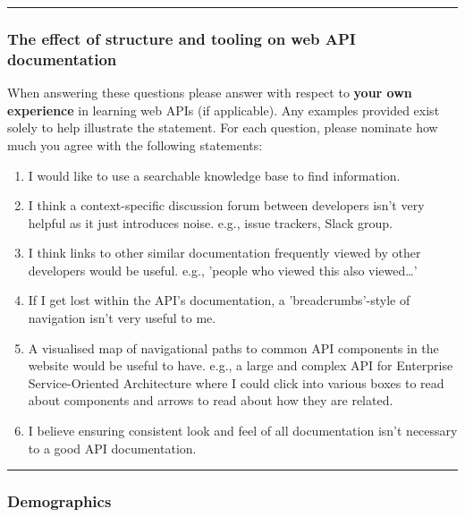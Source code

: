 \bigskip\hrule
\subsubsection*{The effect of structure and tooling on web API documentation}\noindent
When answering these questions please answer with respect to \textbf{your own experience} in learning web APIs (if applicable). Any examples provided exist solely to help illustrate the statement. For each question, please nominate how much you agree with the following statements: \AgreementScale

\begin{enumerate}[label=Q7\alph*.,leftmargin=2\parindent]
\item I would like to use a searchable knowledge base to find information.
\item I think a context-specific discussion forum between developers isn't very helpful as it just introduces noise.  
  e.g., issue trackers, Slack group. 
\item I think links to other similar documentation frequently viewed by other developers would be useful. 
   e.g., 'people who viewed this also viewed…' 
\item If I get lost within the API's documentation, a 'breadcrumbs'-style of navigation isn't very useful to me. 
\item A visualised map of navigational paths to common API components in the website would be useful to have. 
   e.g., a large and complex API for Enterprise Service-Oriented Architecture where I could click into various boxes to read about components and arrows to read about how they are related.   
\item I believe ensuring consistent look and feel of all documentation isn't necessary to a good API documentation. 
\end{enumerate}

\bigskip\hrule
\subsubsection*{Demographics}\noindent

